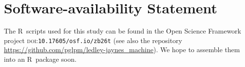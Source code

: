 \documentclass[utf8]{FrontiersinHarvard_mod} %
\providecommand{\href}[2]{#2}
\newcommand*{\doi}[1]{%
\href{https://doi.org/#1}{\textsc{doi}:\allowbreak\nolinkurl{#1}}%
}
\renewcommand*{\|}[1][]{\nonscript\:#1\vert\nonscript\:\mathopen{}}
\begin{document}

\section*{Software-availability Statement}
The R~scripts used for this study can be found in the Open Science Framework project \doi{10.17605/osf.io/zb26t} (see also the repository \url{https://github.com/pglpm/ledley-jaynes\_machine}). We hope to assemble them into an R~package soon.


\end{document}
